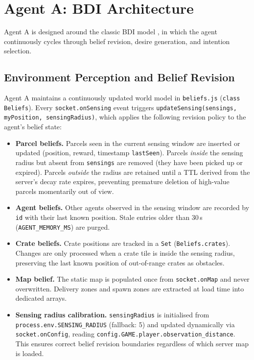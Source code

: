 \documentclass[10pt,a4paper,twocolumn]{article}
\begin{document}
\section{Agent A: BDI Architecture}
\label{sec:bdi}

Agent A is designed around the classic BDI model \cite{rao1995}, in which the
agent continuously cycles through belief revision, desire generation, and
intention selection.

\subsection{Environment Perception and Belief Revision}

Agent A maintains a continuously updated world model in \texttt{beliefs.js}
(\texttt{class Beliefs}).  Every \texttt{socket.onSensing} event triggers
\texttt{updateSensing(sensings, myPosition, sensingRadius)}, which applies the
following revision policy to the agent's belief state:

\begin{itemize}[noitemsep]
  \item \textbf{Parcel beliefs.} Parcels seen in the current sensing window
        are inserted or updated (position, reward, timestamp \texttt{lastSeen}).
        Parcels \emph{inside} the sensing radius but absent from \texttt{sensings}
        are removed (they have been picked up or expired).  Parcels \emph{outside}
        the radius are retained until a TTL derived from the server's decay rate
        expires, preventing premature deletion of high-value parcels momentarily
        out of view.
  \item \textbf{Agent beliefs.} Other agents observed in the sensing window are
        recorded by \texttt{id} with their last known position.  Stale entries
        older than 30\,s (\texttt{AGENT\_MEMORY\_MS}) are purged.
  \item \textbf{Crate beliefs.} Crate positions are tracked in a \texttt{Set}
        (\texttt{Beliefs.crates}).  Changes are only processed when a crate tile
        is inside the sensing radius, preserving the last known position of
        out-of-range crates as obstacles.
  \item \textbf{Map belief.} The static map is populated once from
        \texttt{socket.onMap} and never overwritten.  Delivery zones and spawn
        zones are extracted at load time into dedicated arrays.
  \item \textbf{Sensing radius calibration.} \texttt{sensingRadius} is
        initialised from \texttt{process.env.SENSING\_RADIUS} (fallback: 5) and
        updated dynamically via \texttt{socket.onConfig}, reading
        \texttt{config.GAME.player.observation\_distance}.  This ensures correct
        belief revision boundaries regardless of which server map is loaded.
\end{itemize}
\end{document}
